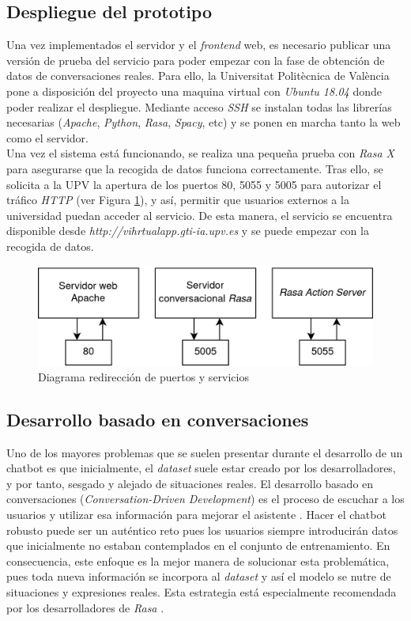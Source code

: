 \subsection{Despliegue del prototipo}
\label{despliegue}
Una vez implementados el servidor y el \textit{frontend} web, es necesario publicar una versión de prueba del servicio para poder empezar con la fase de obtención de datos de conversaciones reales. Para ello, la Universitat Politècnica de València pone a disposición del proyecto una maquina virtual con \textit{Ubuntu 18.04} donde poder realizar el despliegue. Mediante acceso \textit{SSH} se instalan todas las librerías necesarias (\textit{Apache}, \textit{Python}, \textit{Rasa}, \textit{Spacy}, etc) y se ponen en marcha tanto la web como el servidor.\\

Una vez el sistema está funcionando, se realiza una pequeña prueba con \textit{Rasa X} para asegurarse que la recogida de datos funciona correctamente. Tras ello, se solicita a la UPV la apertura de los puertos 80, 5055 y 5005 para autorizar el tráfico \textit{HTTP} (ver Figura \ref{fig:ports}), y así, permitir que usuarios externos a la universidad puedan acceder al servicio. De esta manera, el servicio se encuentra disponible desde \textit{http://vihrtualapp.gti-ia.upv.es} y se puede empezar con la recogida de datos.\\

\begin{figure}[htbp]
\centering
\includegraphics[scale=0.3]{../images/ports.png} 
\caption{Diagrama redirección de puertos y servicios} 
\label{fig:ports}
\end{figure}


\subsection{Desarrollo basado en conversaciones}
\label{cdd}
Uno de los mayores problemas que se suelen presentar durante el desarrollo de un chatbot es que inicialmente, el \textit{dataset} suele estar creado por los desarrolladores, y por tanto, sesgado y alejado de situaciones reales. El desarrollo basado en conversaciones (\textit{Conversation-Driven Development}) es el proceso de escuchar a los usuarios y utilizar esa información para mejorar el asistente \cite{conversationDriven}. Hacer el chatbot robusto puede ser un auténtico reto pues los usuarios siempre introducirán datos que inicialmente no estaban contemplados en el conjunto de entrenamiento. En consecuencia, este enfoque es la mejor manera de solucionar esta problemática, pues toda nueva información se incorpora al \textit{dataset} y así el modelo se nutre de situaciones y expresiones reales. Esta estrategia está especialmente recomendada por los desarrolladores de \textit{Rasa} \cite{bestPracticesNLU}.\\

